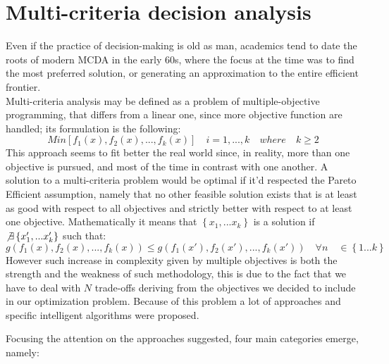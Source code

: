 \documentclass{article}
\begin{document}
\section{Multi-criteria decision analysis}
Even if the practice of decision-making is old as man, academics tend to date the roots of modern MCDA in the early 60s, where the focus at the time was to find the most preferred solution, or generating an approximation to the entire efficient frontier\cite{greco_multiple_2016}.
\\
Multi-criteria analysis may be defined as a problem of multiple-objective programming, that differs from a linear one,
since more objective function are handled; its formulation is the following:
	$$
	Min[f_1(x),f_2(x),...,f_k(x)] \quad i=1,...,k \quad where \quad k\geq2
	$$
This approach seems to fit better the real world since, in reality, more than one objective is pursued, and most of the time in contrast with one another.
A solution to a multi-criteria problem would be optimal if it'd respected the Pareto Efficient assumption, namely that no other feasible solution exists that is at least as good with respect to all objectives and strictly better with respect to at least one objective. Mathematically it means that $\left\{x_1,...x_k\right\}$ is a solution if $\not\exists \left\{x'_1,...x'_k\right\}$
such that:
	\[
	g(f_1(x),f_2(x),...,f_k(x)) \leq g(f_1(x'),f_2(x'),...,f_k(x')) \quad \forall n \quad \in  \left\{1...k\right\}
	\]
However such increase in complexity given by multiple objectives is both the strength and the weakness of such methodology, this is due to the fact that we have to deal with $N$ trade-offs deriving from the objectives we decided to include in our optimization problem. Because of this problem a lot of approaches and specific intelligent algorithms were proposed\cite{Cui2017}.

Focusing the attention on the approaches suggested, four main categories emerge, namely:
\end{document}
